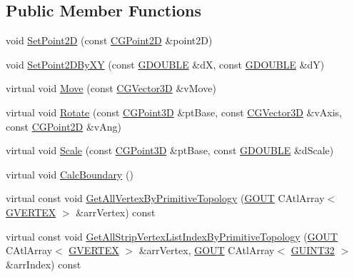 \subsection*{Public Member Functions}
\begin{DoxyCompactItemize}
\item 
void \hyperlink{class_c_g_object_point2_d_adfa38c1b2a40539e48ee03be901799fe}{Set\+Point2\+D} (const \hyperlink{class_c_g_point2_d}{C\+G\+Point2\+D} \&point2\+D)
\item 
void \hyperlink{class_c_g_object_point2_d_a9e088d2d3b0f516fde1cde260442f0f7}{Set\+Point2\+D\+By\+X\+Y} (const \hyperlink{_g_types_8h_afd05ac85f90ee8e2a733928545462cd4}{G\+D\+O\+U\+B\+L\+E} \&d\+X, const \hyperlink{_g_types_8h_afd05ac85f90ee8e2a733928545462cd4}{G\+D\+O\+U\+B\+L\+E} \&d\+Y)
\item 
virtual void \hyperlink{class_c_g_object_point2_d_a43ea91a452ca7bf9e9d1ae40dacec7cd}{Move} (const \hyperlink{_g_point3_d_8h_aa7e73d39f4c991acb5a13c84b498366d}{C\+G\+Vector3\+D} \&v\+Move)
\item 
virtual void \hyperlink{class_c_g_object_point2_d_a94ea1100f380a5c40238d6a78fc7ad1b}{Rotate} (const \hyperlink{class_c_g_point3_d}{C\+G\+Point3\+D} \&pt\+Base, const \hyperlink{_g_point3_d_8h_aa7e73d39f4c991acb5a13c84b498366d}{C\+G\+Vector3\+D} \&v\+Axis, const \hyperlink{class_c_g_point2_d}{C\+G\+Point2\+D} \&v\+Ang)
\item 
virtual void \hyperlink{class_c_g_object_point2_d_a6a9e300cc92733396b3e8b825aa8b9b9}{Scale} (const \hyperlink{class_c_g_point3_d}{C\+G\+Point3\+D} \&pt\+Base, const \hyperlink{_g_types_8h_afd05ac85f90ee8e2a733928545462cd4}{G\+D\+O\+U\+B\+L\+E} \&d\+Scale)
\item 
virtual void \hyperlink{class_c_g_object_point2_d_a64aa33db36c76312560a1d10a352aab9}{Calc\+Boundary} ()
\item 
virtual const void \hyperlink{class_c_g_object_point2_d_aae9138e7f53a3dcfe37e1a2dcb5cebce}{Get\+All\+Vertex\+By\+Primitive\+Topology} (\hyperlink{_g_types_8h_a0858ec221262e635612871d70ca233ad}{G\+O\+U\+T} C\+Atl\+Array$<$ \hyperlink{struct_g_v_e_r_t_e_x}{G\+V\+E\+R\+T\+E\+X} $>$ \&arr\+Vertex) const 
\item 
virtual const void \hyperlink{class_c_g_object_point2_d_a0f118f82789046defd0269c71521c522}{Get\+All\+Strip\+Vertex\+List\+Index\+By\+Primitive\+Topology} (\hyperlink{_g_types_8h_a0858ec221262e635612871d70ca233ad}{G\+O\+U\+T} C\+Atl\+Array$<$ \hyperlink{struct_g_v_e_r_t_e_x}{G\+V\+E\+R\+T\+E\+X} $>$ \&arr\+Vertex, \hyperlink{_g_types_8h_a0858ec221262e635612871d70ca233ad}{G\+O\+U\+T} C\+Atl\+Array$<$ \hyperlink{_g_types_8h_a2e1a1c77d1349057202e2f34e071019c}{G\+U\+I\+N\+T32} $>$ \&arr\+Index) const 

\end{DoxyCompactItemize}
